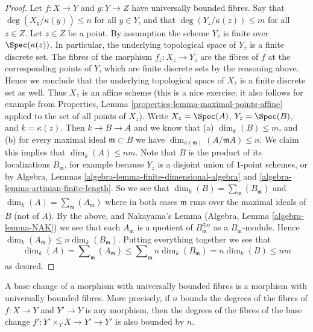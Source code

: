 \begin{proof}
Let $f : X \to Y$ and $g : Y \to Z$ have universally bounded fibres.
Say that $\deg(X_y/\kappa(y)) \leq n$ for all $y \in Y$, and that
$\deg(Y_z/\kappa(z)) \leq m$ for all $z \in Z$.
Let $z \in Z$ be a point. By assumption the scheme
$Y_z$ is finite over $\Spec(\kappa(z))$.
In particular, the underlying topological space of $Y_z$
is a finite discrete set. The fibres of the morphism
$f_z : X_z \to Y_z$ are the fibres of $f$ at the corresponding
points of $Y$, which are finite discrete sets by the reasoning above.
Hence we conclude that the underlying topological space
of $X_z$ is a finite discrete set as well. Thus $X_z$ is an affine
scheme (this is a nice exercise; it also follows for example from
Properties, Lemma \ref{properties-lemma-maximal-points-affine}
applied to the set of all points of $X_z$). Write $X_z = \Spec(A)$,
$Y_z = \Spec(B)$, and $k = \kappa(z)$. Then $k \to B \to A$
and we know that (a) $\dim_k(B) \leq m$, and (b) for every maximal
ideal $\mathfrak m \subset B$ we have
$\dim_{\kappa(\mathfrak m)}(A/\mathfrak mA) \leq n$.
We claim this implies that $\dim_k(A) \leq nm$.
Note that $B$ is the product of its localizations $B_{\mathfrak m}$, for
example because $Y_z$ is a disjoint union of $1$-point schemes, or by
Algebra, Lemmas \ref{algebra-lemma-finite-dimensional-algebra} and
\ref{algebra-lemma-artinian-finite-length}.
So we see that
$\dim_k(B) = \sum_{\mathfrak m}(B_{\mathfrak m})$ and
$\dim_k(A) = \sum_{\mathfrak m}(A_{\mathfrak m})$ where
in both cases $\mathfrak m$ runs over the maximal ideals of
$B$ (not of $A$). By the above, and Nakayama's Lemma
(Algebra, Lemma \ref{algebra-lemma-NAK})
we see that each $A_{\mathfrak m}$ is a quotient of
$B_{\mathfrak m}^{\oplus n}$ as a $B_{\mathfrak m}$-module. Hence
$\dim_k(A_{\mathfrak m}) \leq n \dim_k(B_{\mathfrak m})$. Putting
everything together we see that
$$
\dim_k(A) = \sum\nolimits_{\mathfrak m}(A_{\mathfrak m})
\leq \sum\nolimits_{\mathfrak m} n \dim_k(B_{\mathfrak m})
= n \dim_k(B) \leq nm
$$
as desired.
\end{proof}

\begin{lemma}
\label{lemma-base-change-universally-bounded}
A base change of a morphism with universally bounded fibres is
a morphism with universally bounded fibres. More precisely, if
$n$ bounds the degrees of the fibres of $f : X \to Y$ and $Y' \to Y$
is any morphism, then the degrees of the fibres of the base change
$f' : Y' \times_Y X \to Y' \to Y'$ is also bounded by $n$.
\end{lemma}

